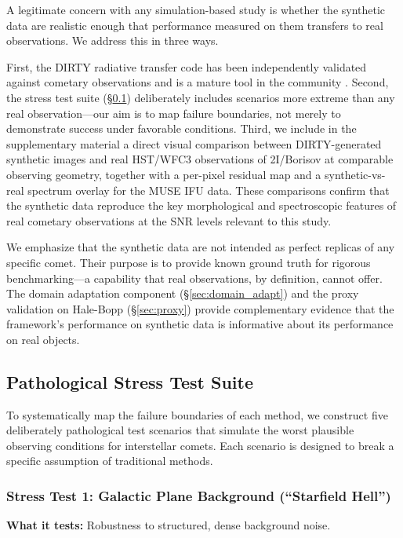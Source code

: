 \documentclass[usenatbib]{mnras}
\begin{document}
A legitimate concern with any simulation-based study is whether the synthetic data are realistic enough that performance measured on them transfers to real observations. We address this in three ways.

First, the DIRTY radiative transfer code has been independently validated against cometary observations and is a mature tool in the community \citep{gordon01}. Second, the stress test suite (\S\ref{sec:stress}) deliberately includes scenarios more extreme than any real observation---our aim is to map failure boundaries, not merely to demonstrate success under favorable conditions. Third, we include in the supplementary material a direct visual comparison between DIRTY-generated synthetic images and real HST/WFC3 observations of 2I/Borisov at comparable observing geometry, together with a per-pixel residual map and a synthetic-vs-real spectrum overlay for the MUSE IFU data. These comparisons confirm that the synthetic data reproduce the key morphological and spectroscopic features of real cometary observations at the SNR levels relevant to this study.

We emphasize that the synthetic data are not intended as perfect replicas of any specific comet. Their purpose is to provide known ground truth for rigorous benchmarking---a capability that real observations, by definition, cannot offer. The domain adaptation component (\S\ref{sec:domain_adapt}) and the proxy validation on Hale-Bopp (\S\ref{sec:proxy}) provide complementary evidence that the framework's performance on synthetic data is informative about its performance on real objects.

\subsection{Pathological Stress Test Suite}\label{sec:stress}

To systematically map the failure boundaries of each method, we construct five deliberately pathological test scenarios that simulate the worst plausible observing conditions for interstellar comets. Each scenario is designed to break a specific assumption of traditional methods.

\subsubsection{Stress Test 1: Galactic Plane Background (``Starfield Hell'')}

\textbf{What it tests:} Robustness to structured, dense background noise.
\end{document}
